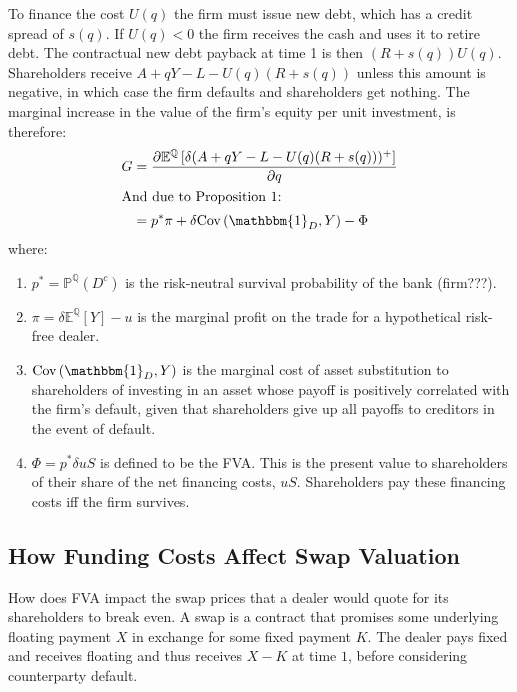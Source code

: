 \documentclass[10pt,a4paper]{article}
\begin{document}
        To finance the cost $U(q)$ the firm must issue new debt, which has a credit spread of $s(q)$. If $U(q) <0$ the firm receives the cash and uses it to retire debt. The contractual new debt payback at time 1 is then $(R+s(q))U(q)$. Shareholders receive $A + qY - L - U(q)(R+s(q))$ unless this amount is negative, in which case the firm defaults and shareholders get nothing. The marginal increase in the value of the firm's equity per unit investment, is therefore:
            \begin{align}
                G &= \frac{\partial \mathbb{E}^{\mathbb{Q}}\left[\delta(A + qY - L - U(q)(R+s(q)))^{+}\right] }{\partial q} \\
                \intertext{And due to Proposition 1:}
                &= p^{\ast}\pi + \delta \text{Cov}\left(\mathbbm{1}_{D}, Y\right)  - \Phi
            \end{align}
        where:
            \begin{enumerate}
                \item $p^{\ast}=\mathbb{P}^{\mathbb{Q}}\left(D^{c}\right) $ is the risk-neutral survival probability of the bank (firm???).
                \item $\pi = \delta \mathbb{E}^{\mathbb{Q}}\left[Y\right] - u $ is the marginal profit on the trade for a hypothetical risk-free dealer.
                \item $\text{Cov}\left(\mathbbm{1}_{D}, Y\right)$ is the marginal cost of asset substitution to shareholders of investing in an asset whose payoff is positively correlated with the firm's default, given that shareholders give up all payoffs to creditors in the event of default. 
                \item $\Phi = p^{\ast}\delta u S$ is defined to be the FVA. This is the present value to shareholders of their share of the net financing costs, $uS$. Shareholders pay these financing costs iff the firm survives.
            \end{enumerate}

        \subsection{How Funding Costs Affect Swap Valuation}
            How does FVA impact the swap prices that a dealer would quote for its shareholders to break even. A swap is a contract that promises some underlying floating payment $X$ in exchange for some fixed payment $K$. The dealer pays fixed and receives floating and thus receives $X-K$ at time $1$, before considering counterparty default. 
\end{document}
